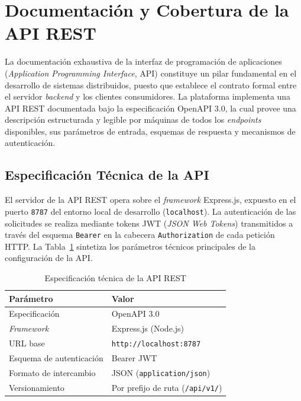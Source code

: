 
\section{Documentaci\'on y Cobertura de la API REST}
\label{sec:cobertura-api}

La documentaci\'on exhaustiva de la interfaz de programaci\'on de aplicaciones
(\textit{Application Programming Interface}, API) constituye un pilar
fundamental en el desarrollo de sistemas distribuidos, puesto que establece el
contrato formal entre el servidor \textit{backend} y los clientes consumidores.
La plataforma implementa una API REST documentada bajo la especificaci\'on
OpenAPI 3.0, la cual provee una descripci\'on estructurada y legible por
m\'aquinas de todos los \textit{endpoints} disponibles, sus par\'ametros de
entrada, esquemas de respuesta y mecanismos de autenticaci\'on.

\subsection{Especificaci\'on T\'ecnica de la API}
\label{subsec:especificacion-api}

El servidor de la API REST opera sobre el \textit{framework} Express.js,
expuesto en el puerto \texttt{8787} del entorno local de desarrollo
(\texttt{localhost}). La autenticaci\'on de las solicitudes se realiza mediante
tokens JWT (\textit{JSON Web Tokens}) transmitidos a trav\'es del esquema
\texttt{Bearer} en la cabecera \texttt{Authorization} de cada petici\'on HTTP.
La Tabla~\ref{tab:especificacion-api} sintetiza los par\'ametros t\'ecnicos
principales de la configuraci\'on de la API.

\begin{table}[htbp]
\centering
\caption{Especificaci\'on t\'ecnica de la API REST}
\label{tab:especificacion-api}
\begin{tabular}{|l|l|}
\hline
\textbf{Par\'ametro} & \textbf{Valor} \\
\hline
Especificaci\'on          & OpenAPI 3.0 \\
\hline
\textit{Framework}        & Express.js (Node.js) \\
\hline
URL base                  & \texttt{http://localhost:8787} \\
\hline
Esquema de autenticaci\'on & Bearer JWT \\
\hline
Formato de intercambio    & JSON (\texttt{application/json}) \\
\hline
Versionamiento            & Por prefijo de ruta (\texttt{/api/v1/}) \\
\hline
\end{tabular}
\end{table}

